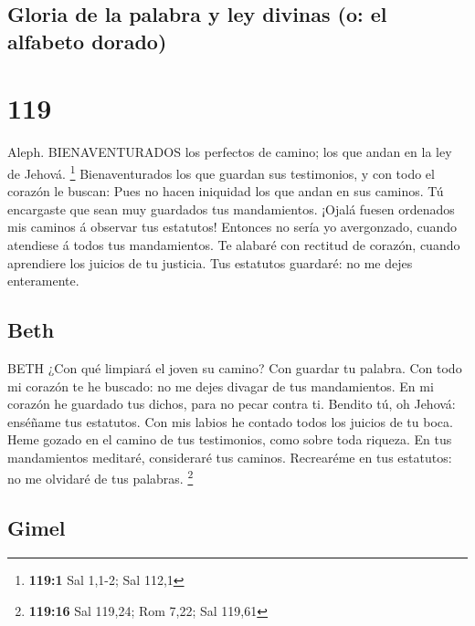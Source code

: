 \hypertarget{gloria-de-la-palabra-y-ley-divinas-o-el-alfabeto-dorado}{%
\subsection{Gloria de la palabra y ley divinas (o: el alfabeto
dorado)}\label{gloria-de-la-palabra-y-ley-divinas-o-el-alfabeto-dorado}}

\hypertarget{section-118}{%
\section{119}\label{section-118}}

 Aleph. BIENAVENTURADOS los perfectos de camino; los que
andan en la ley de Jehová. \footnote{\textbf{119:1} Sal 1,1-2; Sal 112,1}
 Bienaventurados los que guardan sus testimonios, y con todo
el corazón le buscan:  Pues no hacen iniquidad los que andan
en sus caminos.  Tú encargaste que sean muy guardados tus
mandamientos.  ¡Ojalá fuesen ordenados mis caminos á
observar tus estatutos!  Entonces no sería yo avergonzado,
cuando atendiese á todos tus mandamientos.  Te alabaré con
rectitud de corazón, cuando aprendiere los juicios de tu justicia.
 Tus estatutos guardaré: no me dejes enteramente.

\hypertarget{beth}{%
\subsection{Beth}\label{beth}}

 BETH ¿Con qué limpiará el joven su camino? Con guardar tu
palabra.  Con todo mi corazón te he buscado: no me dejes
divagar de tus mandamientos.  En mi corazón he guardado tus
dichos, para no pecar contra ti.  Bendito tú, oh Jehová:
enséñame tus estatutos.  Con mis labios he contado todos
los juicios de tu boca.  Heme gozado en el camino de tus
testimonios, como sobre toda riqueza.  En tus mandamientos
meditaré, consideraré tus caminos.  Recrearéme en tus
estatutos: no me olvidaré de tus palabras. \footnote{\textbf{119:16} Sal
  119,24; Rom 7,22; Sal 119,61}

\hypertarget{gimel}{%
\subsection{Gimel}\label{gimel}}

